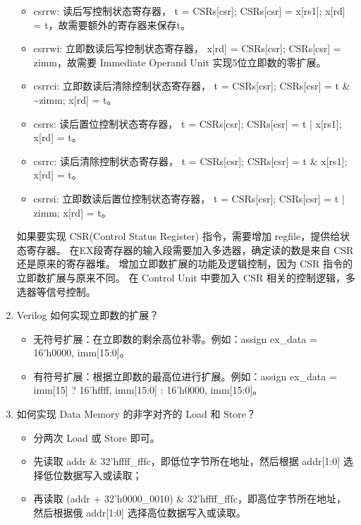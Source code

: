 \documentclass[UTF8]{article}
\begin{document}
\begin{enumerate}
    \begin{itemize}
        \item csrrw: 读后写控制状态寄存器， t = CSRs[csr]; CSRs[csr] = x[rs1]; x[rd] = t，故需要额外的寄存器来保存t。
        \item csrrwi: 立即数读后写控制状态寄存器， x[rd] = CSRs[csr]; CSRs[csr] = zimm，故需要 Immediate Operand Unit 实现5位立即数的零扩展。
        \item csrrci: 立即数读后清除控制状态寄存器， t = CSRs[csr]; CSRs[csr] = t \& \textasciitilde zimm; x[rd] = t。
        \item csrrs: 读后置位控制状态寄存器， t = CSRs[csr]; CSRs[csr] = t | x[rs1]; x[rd] = t。
        \item csrrc: 读后清除控制状态寄存器， t = CSRs[csr]; CSRs[csr] = t \& x[rs1]; x[rd] = t。
        \item csrrsi: 立即数读后置位控制状态寄存器， t = CSRs[csr]; CSRs[csr] = t | zimm; x[rd] = t。
    \end{itemize}

    如果要实现 CSR(Control Status Register) 指令，需要增加 regfile，提供给状态寄存器。
    在EX段寄存器的输入段需要加入多选器，确定读的数是来自 CSR 还是原来的寄存器堆。
    增加立即数扩展的功能及逻辑控制，因为 CSR 指令的立即数扩展与原来不同。
    在 Control Unit 中要加入 CSR 相关的控制逻辑，多选器等信号控制。
    
    \item Verilog 如何实现立即数的扩展？
    \begin{itemize}
        \item 无符号扩展：在立即数的剩余高位补零。例如：assign ex\_data = {16'h0000, imm[15:0]}。
        \item 有符号扩展：根据立即数的最高位进行扩展。例如：assign ex\_data = imm[15] ? {16'hffff, imm[15:0]} : {16'h0000, imm[15:0]}。
    \end{itemize}
    
    \item 如何实现 Data Memory 的非字对齐的 Load 和 Store？
    
    \begin{itemize}
        \item 分两次 Load 或 Store 即可。
        \item 先读取 addr \& 32'hffff\_fffc，即低位字节所在地址，然后根据 addr[1:0] 选择低位数据写入或读取；
        \item 再读取 (addr + 32'h0000\_0010) \& 32'hffff\_fffc，即高位字节所在地址，然后根据俄 addr[1:0] 选择高位数据写入或读取。
    \end{itemize}
    

\end{enumerate}
\end{document}
